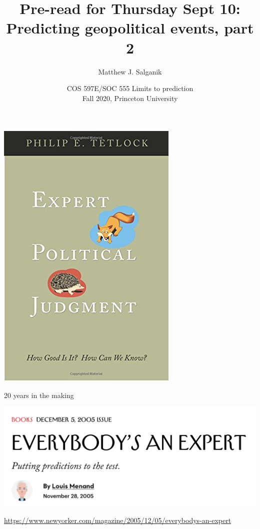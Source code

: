 \documentclass[aspectratio=169]{beamer}
\title[]{Pre-read for Thursday Sept 10:\\Predicting geopolitical events, part 2}
\author[]{Matthew J. Salganik}
\institute[]{}
\date[]{COS 597E/SOC 555 Limits to prediction\\Fall 2020, Princeton University}
\begin{document}
\frame{\titlepage}
\begin{frame}
\frametitle{}

\begin{center}
\includegraphics[height=0.7\textheight]{figures/tetlock_expert_2005_cover}
\end{center}

\vfill
20 years in the making

\end{frame}
\begin{frame}

\begin{center}
\includegraphics[width=0.9\textheight]{figures/menand_everybodys_2005_title}
\end{center}

\vfill
\url{https://www.newyorker.com/magazine/2005/12/05/everybodys-an-expert}

\end{frame}
\end{document}
